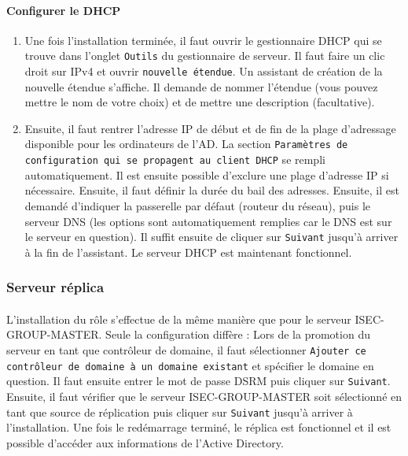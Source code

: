 			\paragraph{Configurer le DHCP}
				\begin{enumerate}
					\item Une fois l’installation terminée, il faut ouvrir le gestionnaire DHCP qui se trouve dans l’onglet \texttt{Outils} du gestionnaire de serveur. Il faut faire un clic droit sur IPv4 et ouvrir \texttt{nouvelle étendue}. Un assistant de création de la nouvelle étendue s’affiche. Il demande de nommer l’étendue (vous pouvez mettre le nom de votre choix) et de mettre une description (facultative). 
					\item Ensuite, il faut rentrer l’adresse IP de début et de fin de la plage d’adressage disponible pour les ordinateurs de l’AD. La section \texttt{Paramètres de configuration qui se propagent au client DHCP} se rempli automatiquement. Il est ensuite possible d’exclure une plage d’adresse IP si nécessaire. Ensuite, il faut définir la durée du bail des adresses. Ensuite, il est demandé d’indiquer la passerelle par défaut (routeur du réseau), puis le serveur DNS (les options sont automatiquement remplies car le DNS est sur le serveur en question). Il suffit ensuite de cliquer sur \texttt{Suivant} jusqu’à arriver à la fin de l’assistant. Le serveur DHCP est maintenant fonctionnel.
				\end{enumerate}

		\subsubsection{Serveur réplica}
			\paragraph{}
				L’installation du rôle s’effectue de la même manière que pour le serveur ISEC-GROUP-MASTER. Seule la configuration diffère : Lors de la promotion du serveur en tant que contrôleur de domaine, il faut sélectionner \texttt{Ajouter ce contrôleur de domaine à un domaine existant} et spécifier le domaine en question. Il faut ensuite entrer le mot de passe DSRM puis cliquer sur \texttt{Suivant}. Ensuite, il faut vérifier que le serveur ISEC-GROUP-MASTER soit sélectionné en tant que source de réplication puis cliquer sur \texttt{Suivant} jusqu’à arriver à l’installation. Une fois le redémarrage terminé, le réplica est fonctionnel et il est possible d’accéder aux informations de l’Active Directory.
